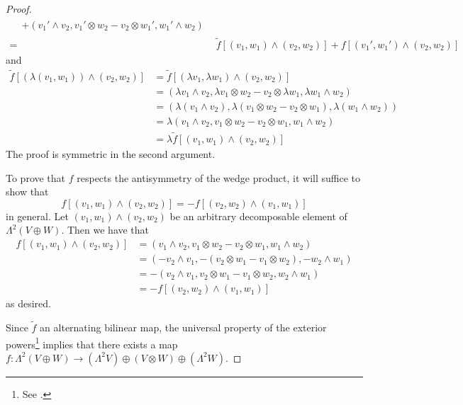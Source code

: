 \documentclass[../psets.tex]{subfiles}
\begin{document}
\begin{enumerate}
\begin{enumerate}
\begin{proof}
\begin{align*}
\begin{split}
                    &+ (v_1'\wedge v_2,v_1'\otimes w_2-v_2\otimes w_1',w_1'\wedge w_2)
                \end{split}\\
                ={}& \tilde{f}[(v_1,w_1)\wedge(v_2,w_2)]+f[(v_1',w_1')\wedge(v_2,w_2)]
            \end{align*}
            and
            \begin{align*}
                \tilde{f}[(\lambda(v_1,w_1))\wedge(v_2,w_2)] &= \tilde{f}[(\lambda v_1,\lambda w_1)\wedge(v_2,w_2)]\\
                &= (\lambda v_1\wedge v_2,\lambda v_1\otimes w_2-v_2\otimes\lambda w_1,\lambda w_1\wedge w_2)\\
                &= (\lambda(v_1\wedge v_2),\lambda(v_1\otimes w_2-v_2\otimes w_1),\lambda(w_1\wedge w_2))\\
                &= \lambda(v_1\wedge v_2,v_1\otimes w_2-v_2\otimes w_1,w_1\wedge w_2)\\
                &= \lambda\tilde{f}[(v_1,w_1)\wedge(v_2,w_2)]
            \end{align*}
            The proof is symmetric in the second argument.\par
            To prove that $f$ respects the antisymmetry of the wedge product, it will suffice to show that
            \begin{equation*}
                f[(v_1,w_1)\wedge(v_2,w_2)] = -f[(v_2,w_2)\wedge(v_1,w_1)]
            \end{equation*}
            in general. Let $(v_1,w_1)\wedge(v_2,w_2)$ be an arbitrary decomposable element of $\Lambda^2(V\oplus W)$. Then we have that
            \begin{align*}
                f[(v_1,w_1)\wedge(v_2,w_2)] &= (v_1\wedge v_2,v_1\otimes w_2-v_2\otimes w_1,w_1\wedge w_2)\\
                &= (-v_2\wedge v_1,-(v_2\otimes w_1-v_1\otimes w_2),-w_2\wedge w_1)\\
                &= -(v_2\wedge v_1,v_2\otimes w_1-v_1\otimes w_2,w_2\wedge w_1)\\
                &= -f[(v_2,w_2)\wedge(v_1,w_1)]
            \end{align*}
            as desired.\par\smallskip
            Since $\tilde{f}$ an alternating bilinear map, the universal property of the exterior powers\footnote{See \textcite[472]{bib:FultonHarris}.} implies that there exists a map $f:\Lambda^2(V\oplus W)\to(\Lambda^2V)\oplus(V\otimes W)\oplus(\Lambda^2W)$.\par\smallskip

\end{proof}
\end{enumerate}
\end{enumerate}
\end{document}
